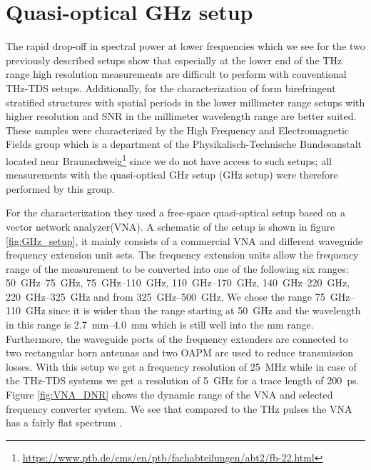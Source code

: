 \section{Quasi-optical GHz setup}
\label{sec:GHz_setup}
The rapid drop-off in spectral power at lower frequencies which we see for the two previously described setups show that especially at the lower end of the THz range high resolution measurements are difficult to perform with conventional THz-TDS setups. Additionally, for the characterization of form birefringent stratified structures with spatial periods in the lower millimeter range setups with higher resolution and SNR in the millimeter wavelength range are better suited. These samples were characterized by the High Frequency and Electromagnetic Fields group which is a department of the Physikalisch-Technische Bundesanstalt located near Braunschweig\footnote{\url{https://www.ptb.de/cms/en/ptb/fachabteilungen/abt2/fb-22.html}} since we do not have access to such setups; all measurements with the quasi-optical GHz setup (GHz setup) were therefore performed by this group.

For the characterization they used a free-space quasi-optical setup based on a vector network analyzer(VNA). A schematic of the setup is shown in figure \ref{fig:GHz_setup}, it mainly consists of a commercial VNA and different waveguide frequency extension unit sets. The frequency extension units allow the frequency range of the measurement to be converted into one of the following six ranges: \SIrange[range-phrase=--]{50}{75}{\giga \hertz}, \SIrange[range-phrase=--]{75}{110}{\giga \hertz}, \SIrange[range-phrase=--]{110}{170}{\giga \hertz}, \SIrange[range-phrase=--]{140}{220}{\giga \hertz}, \SIrange[range-phrase=--]{220}{325}{\giga \hertz} and from \SIrange{325}{500}{\giga \hertz}. We chose the range \SIrange{75}{110}{\giga \hertz} since it is wider than the range starting at \SI{50}{\giga \hertz} and the wavelength in this range is \SIrange{2.7}{4.0}{\milli \meter} which is still well into the \si{\milli \meter} range. Furthermore, the waveguide ports of the frequency extenders are connected to two rectangular horn antennas and two OAPM are used to reduce transmission losses. With this setup we get a frequency resolution of \SI{25}{\mega \hertz} while in case of the THz-TDS systems we get a resolution of \SI{5}{\giga \hertz} for a trace length of \SI{200}{\pico \second}. Figure \ref{fig:VNA_DNR} shows the dynamic range of the VNA and selected frequency converter system. We see that compared to the THz pulses the VNA has a fairly flat spectrum \cite{VNADNR2013, Kazemipour2015}.

